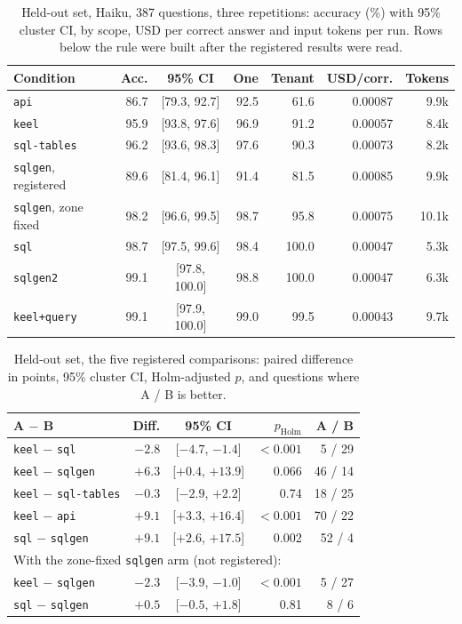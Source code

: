 \documentclass[sigconf, nonacm]{acmart}
\newcommand{\code}[1]{\texttt{#1}}
\begin{document}
\begin{table}[t]
\caption{Held-out set, Haiku, 387 questions, three repetitions: accuracy (\%) with 95\% cluster CI, by scope, USD per correct answer and input tokens per run. Rows below the rule were built after the registered results were read.}
\label{tab:heldout}
\centering
\footnotesize
\setlength{\tabcolsep}{2.6pt}
\begin{tabular}{l r c r r r r}
\toprule
Condition & Acc. & 95\% CI & One & Tenant & USD/corr. & Tokens \\
\midrule
\code{api} & 86.7 & [79.3, 92.7] & 92.5 & 61.6 & 0.00087 & 9.9k \\
\code{keel} & 95.9 & [93.8, 97.6] & 96.9 & 91.2 & 0.00057 & 8.4k \\
\code{sql-tables} & 96.2 & [93.6, 98.3] & 97.6 & 90.3 & 0.00073 & 8.2k \\
\code{sqlgen}, registered & 89.6 & [81.4, 96.1] & 91.4 & 81.5 & 0.00085 & 9.9k \\
\code{sqlgen}, zone fixed & 98.2 & [96.6, 99.5] & 98.7 & 95.8 & 0.00075 & 10.1k \\
\code{sql} & 98.7 & [97.5, 99.6] & 98.4 & 100.0 & 0.00047 & 5.3k \\
\midrule
\code{sqlgen2} & 99.1 & [97.8, 100.0] & 98.8 & 100.0 & 0.00047 & 6.3k \\
\code{keel+query} & 99.1 & [97.9, 100.0] & 99.0 & 99.5 & 0.00043 & 9.7k \\
\bottomrule
\end{tabular}
\end{table}

\begin{table}[t]
\caption{Held-out set, the five registered comparisons: paired difference in points, 95\% cluster CI, Holm-adjusted $p$, and questions where A / B is better.}
\label{tab:planned}
\centering
\footnotesize
\setlength{\tabcolsep}{3pt}
\begin{tabular}{l r c r r}
\toprule
A $-$ B & Diff. & 95\% CI & $p_{\mathrm{Holm}}$ & A / B \\
\midrule
\code{keel} $-$ \code{sql} & $-2.8$ & [$-4.7$, $-1.4$] & $<0.001$ & 5 / 29 \\
\code{keel} $-$ \code{sqlgen} & $+6.3$ & [$+0.4$, $+13.9$] & 0.066 & 46 / 14 \\
\code{keel} $-$ \code{sql-tables} & $-0.3$ & [$-2.9$, $+2.2$] & 0.74 & 18 / 25 \\
\code{keel} $-$ \code{api} & $+9.1$ & [$+3.3$, $+16.4$] & $<0.001$ & 70 / 22 \\
\code{sql} $-$ \code{sqlgen} & $+9.1$ & [$+2.6$, $+17.5$] & 0.002 & 52 / 4 \\
\midrule
\multicolumn{5}{l}{With the zone-fixed \code{sqlgen} arm (not registered):} \\
\code{keel} $-$ \code{sqlgen} & $-2.3$ & [$-3.9$, $-1.0$] & $<0.001$ & 5 / 27 \\
\code{sql} $-$ \code{sqlgen} & $+0.5$ & [$-0.5$, $+1.8$] & 0.81 & 8 / 6 \\
\bottomrule
\end{tabular}
\end{table}
\end{document}
